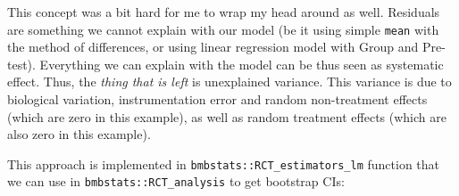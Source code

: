 \documentclass[
]{book}
\newenvironment{Shaded}{\begin{snugshade}}{\end{snugshade}}
\newcommand{\CommentTok}[1]{\textcolor[rgb]{0.56,0.35,0.01}{\textit{#1}}}
\newcommand{\DataTypeTok}[1]{\textcolor[rgb]{0.13,0.29,0.53}{#1}}
\newcommand{\DecValTok}[1]{\textcolor[rgb]{0.00,0.00,0.81}{#1}}
\newcommand{\KeywordTok}[1]{\textcolor[rgb]{0.13,0.29,0.53}{\textbf{#1}}}
\newcommand{\NormalTok}[1]{#1}
\newcommand{\OperatorTok}[1]{\textcolor[rgb]{0.81,0.36,0.00}{\textbf{#1}}}
\newcommand{\StringTok}[1]{\textcolor[rgb]{0.31,0.60,0.02}{#1}}
\begin{document}
\begin{Shaded}
\end{Shaded}

This concept was a bit hard for me to wrap my head around as well. Residuals are something we cannot explain with our model (be it using simple \texttt{mean} with the method of differences, or using linear regression model with Group and Pre-test). Everything we can explain with the model can be thus seen as systematic effect. Thus, the \emph{thing that is left} is unexplained variance. This variance is due to biological variation, instrumentation error and random non-treatment effects (which are zero in this example), as well as random treatment effects (which are also zero in this example).

This approach is implemented in \texttt{bmbstats::RCT\_estimators\_lm} function that we can use in \texttt{bmbstats::RCT\_analysis} to get bootstrap CIs:
\end{document}
